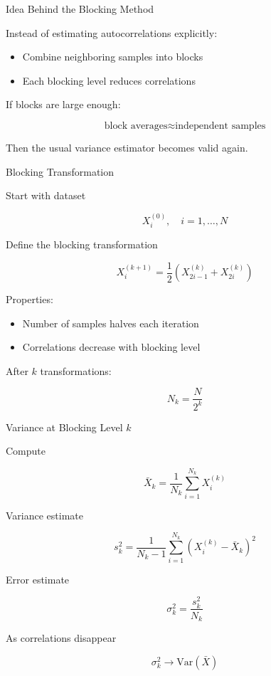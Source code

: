 \documentclass{beamer}
\begin{document}
\begin{frame}{Idea Behind the Blocking Method}

  Instead of estimating autocorrelations explicitly:

  \begin{itemize}
  \item Combine neighboring samples into blocks
  \item Each blocking level reduces correlations
  \end{itemize}

  If blocks are large enough:

  \[
  \text{block averages} \approx \text{independent samples}
  \]

  Then the usual variance estimator becomes valid again.
\end{frame}


\begin{frame}{Blocking Transformation}

  Start with dataset

  \[
  X^{(0)}_i, \quad i=1,\dots,N
  \]

  Define the blocking transformation

  \[
  X^{(k+1)}_i
  =
  \frac{1}{2}
  \left(
  X^{(k)}_{2i-1}
  +
  X^{(k)}_{2i}
  \right)
  \]

  Properties:

  \begin{itemize}
  \item Number of samples halves each iteration
  \item Correlations decrease with blocking level
  \end{itemize}

  After $k$ transformations:

  \[
  N_k = \frac{N}{2^k}
  \]
\end{frame}


\begin{frame}{Variance at Blocking Level $k$}

  Compute

  \[
  \bar X_k
  =
  \frac{1}{N_k}
  \sum_{i=1}^{N_k} X^{(k)}_i
  \]

  Variance estimate

  \[
  s_k^2
  =
  \frac{1}{N_k-1}
  \sum_{i=1}^{N_k}
  \left(
  X^{(k)}_i - \bar X_k
  \right)^2
  \]

  Error estimate

  \[
  \sigma_k^2
  =
  \frac{s_k^2}{N_k}
  \]

  As correlations disappear

  \[
  \sigma_k^2
  \rightarrow
  \mathrm{Var}(\bar X)
  \]
\end{frame}
\end{document}
